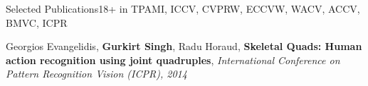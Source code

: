 \documentclass{resume_long} %
\begin{document}
\begin{rSection}{Selected Publications}{18+\footnotesize{ in TPAMI, ICCV, CVPRW, ECCVW, WACV, ACCV, BMVC, ICPR}}


\vspace{-0.03in}
\small{Georgios Evangelidis, \textbf{Gurkirt Singh}, Radu Horaud},
\textbf{Skeletal Quads: Human action recognition using joint quadruples},
\textit{\small{International Conference on Pattern Recognition Vision (ICPR), 2014}}





\end{rSection}
\end{document}
